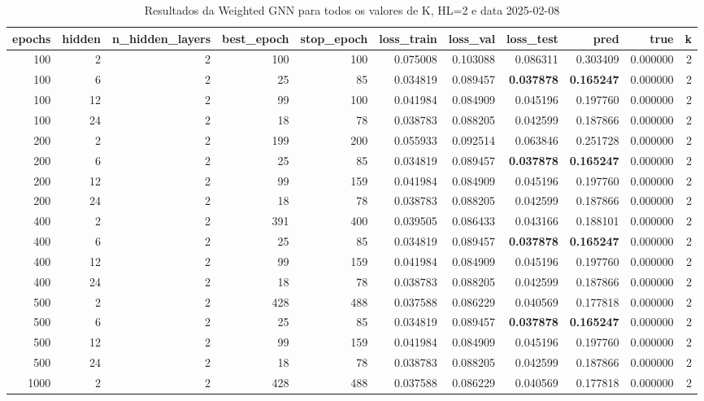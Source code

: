 \begin{table}
\caption{Resultados da Weighted GNN para todos os valores de K, HL=2 e data 2025-02-08}
\label{tab:weighted_gnn_results_allk_hl2_d20250208}
\begin{tabular}{rrrrrrrrrrr}
\toprule
epochs & hidden & n\_hidden\_layers & best\_epoch & stop\_epoch & loss\_train & loss\_val & loss\_test & pred & true & k \\
\midrule
100 & 2 & 2 & 100 & 100 & 0.075008 & 0.103088 & 0.086311 & 0.303409 & 0.000000 & 2 \\
100 & 6 & 2 & 25 & 85 & 0.034819 & 0.089457 & \textbf{0.037878} & \textbf{0.165247} & 0.000000 & 2 \\
100 & 12 & 2 & 99 & 100 & 0.041984 & 0.084909 & 0.045196 & 0.197760 & 0.000000 & 2 \\
100 & 24 & 2 & 18 & 78 & 0.038783 & 0.088205 & 0.042599 & 0.187866 & 0.000000 & 2 \\
200 & 2 & 2 & 199 & 200 & 0.055933 & 0.092514 & 0.063846 & 0.251728 & 0.000000 & 2 \\
200 & 6 & 2 & 25 & 85 & 0.034819 & 0.089457 & \textbf{0.037878} & \textbf{0.165247} & 0.000000 & 2 \\
200 & 12 & 2 & 99 & 159 & 0.041984 & 0.084909 & 0.045196 & 0.197760 & 0.000000 & 2 \\
200 & 24 & 2 & 18 & 78 & 0.038783 & 0.088205 & 0.042599 & 0.187866 & 0.000000 & 2 \\
400 & 2 & 2 & 391 & 400 & 0.039505 & 0.086433 & 0.043166 & 0.188101 & 0.000000 & 2 \\
400 & 6 & 2 & 25 & 85 & 0.034819 & 0.089457 & \textbf{0.037878} & \textbf{0.165247} & 0.000000 & 2 \\
400 & 12 & 2 & 99 & 159 & 0.041984 & 0.084909 & 0.045196 & 0.197760 & 0.000000 & 2 \\
400 & 24 & 2 & 18 & 78 & 0.038783 & 0.088205 & 0.042599 & 0.187866 & 0.000000 & 2 \\
500 & 2 & 2 & 428 & 488 & 0.037588 & 0.086229 & 0.040569 & 0.177818 & 0.000000 & 2 \\
500 & 6 & 2 & 25 & 85 & 0.034819 & 0.089457 & \textbf{0.037878} & \textbf{0.165247} & 0.000000 & 2 \\
500 & 12 & 2 & 99 & 159 & 0.041984 & 0.084909 & 0.045196 & 0.197760 & 0.000000 & 2 \\
500 & 24 & 2 & 18 & 78 & 0.038783 & 0.088205 & 0.042599 & 0.187866 & 0.000000 & 2 \\
1000 & 2 & 2 & 428 & 488 & 0.037588 & 0.086229 & 0.040569 & 0.177818 & 0.000000 & 2 \\

\end{tabular}
\end{table}
